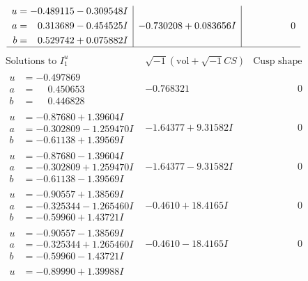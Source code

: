 \documentclass[1p]{elsarticle_modified}
\theoremstyle{definition}
\newcommand{\I}{\sqrt{-1}}
\begin{document}
$$\begin{array}{c|c|c}
\begin{aligned}
u &= -0.489115 - 0.309548 I \\
a &= \phantom{-}0.313689 - 0.454525 I \\
b &= \phantom{-}0.529742 + 0.075882 I\end{aligned}
 & -0.730208 + 0.083656 I & \phantom{-0.000000 } 0\\
 \hline 
 \end{array}$$\newpage$$\begin{array}{c|c|c}  
\text{Solutions to }I^u_{1}& \I (\text{vol} + \sqrt{-1}CS) & \text{Cusp shape}\\
 \hline 
\begin{aligned}
u &= -0.497869\phantom{ +0.000000I} \\
a &= \phantom{-}0.450653\phantom{ +0.000000I} \\
b &= \phantom{-}0.446828\phantom{ +0.000000I}\end{aligned}
 & -0.768321\phantom{ +0.000000I} & \phantom{-0.000000 } 0 \\ \hline\begin{aligned}
u &= -0.87680 + 1.39604 I \\
a &= -0.302809 - 1.259470 I \\
b &= -0.61138 + 1.39569 I\end{aligned}
 & -1.64377 + 9.31582 I & \phantom{-0.000000 } 0 \\ \hline\begin{aligned}
u &= -0.87680 - 1.39604 I \\
a &= -0.302809 + 1.259470 I \\
b &= -0.61138 - 1.39569 I\end{aligned}
 & -1.64377 - 9.31582 I & \phantom{-0.000000 } 0 \\ \hline\begin{aligned}
u &= -0.90557 + 1.38569 I \\
a &= -0.325344 - 1.265460 I \\
b &= -0.59960 + 1.43721 I\end{aligned}
 & -0.4610 + 18.4165 I & \phantom{-0.000000 } 0 \\ \hline\begin{aligned}
u &= -0.90557 - 1.38569 I \\
a &= -0.325344 + 1.265460 I \\
b &= -0.59960 - 1.43721 I\end{aligned}
 & -0.4610 - 18.4165 I & \phantom{-0.000000 } 0 \\ \hline\begin{aligned}
u &= -0.89990 + 1.39988 I \\

\end{aligned}
\end{array}$$
\end{document}
